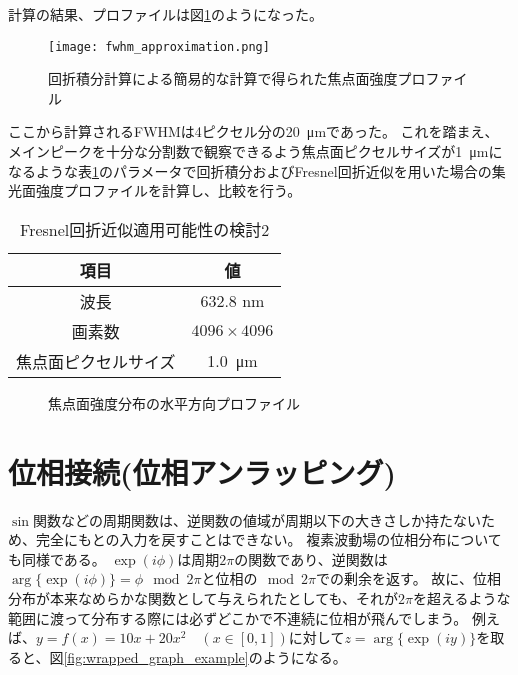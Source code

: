 計算の結果、プロファイルは図\ref{fig:fwhm_approximation}のようになった。

\begin{figure}[ht]
\centering
\texttt{[image: fwhm\_approximation.png]}
\caption{回折積分計算による簡易的な計算で得られた焦点面強度プロファイル}
\label{fig:fwhm_approximation}
\end{figure}

ここから計算されるFWHMは4ピクセル分の\SI{20}{\micro \metre}であった。
これを踏まえ、メインピークを十分な分割数で観察できるよう焦点面ピクセルサイズが\SI{1}{\micro \metre}になるような表\ref{tb:check_approximation_validity_2}のパラメータで回折積分およびFresnel回折近似を用いた場合の集光面強度プロファイルを計算し、比較を行う。

\begin{table}[!ht]
\begin{center}
  \begin{tabular}{|c|c|} \hline
    項目 & 値 \\ \hline
    波長 & 632.8 nm \\
    画素数 & $4096 \times 4096$ \\
    焦点面ピクセルサイズ & \SI{1.0}{\micro \metre} \\ \hline
  \end{tabular}
  \caption{Fresnel回折近似適用可能性の検討2}
  \label{tb:check_approximation_validity_2}
\end{center}
\end{table}



\begin{figure}[!ht]
\centering

\caption[]{焦点面強度分布の水平方向プロファイル}
\label{fig:fwhm_explanation}
\end{figure}



\clearpage
\newpage

\section{位相接続(位相アンラッピング)}
$\sin$関数などの周期関数は、逆関数の値域が周期以下の大きさしか持たないため、完全にもとの入力を戻すことはできない。
複素波動場の位相分布についても同様である。
$\exp(i\phi)$は周期$2\pi$の関数であり、逆関数は$\arg\{\exp(i\phi)\}=\phi \mod{2\pi}$と位相の$\mod{2\pi}$での剰余を返す。
故に、位相分布が本来なめらかな関数として与えられたとしても、それが$2\pi$を超えるような範囲に渡って分布する際には必ずどこかで不連続に位相が飛んでしまう。
例えば、$y = f(x) = 10x + 20x^2 \quad (x \in [0, 1])$に対して$z = \arg\{\exp(iy)\}$を取ると、図\ref{fig:wrapped_graph_example}のようになる。

